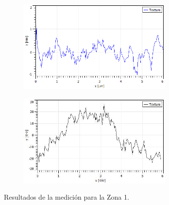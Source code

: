 \begin{figure}[H]
    \begin{subfigure}[b]{0.45\textwidth}
        \includegraphics[width = 0.85\textwidth]{figures/chap4/cdte-ag/afm-nsom-results/10um/CdTe_Ag_10um_profile.jpg}
    \end{subfigure}\hfill
    \begin{subfigure}[b]{0.45\textwidth}
        \includegraphics[width = 0.85\textwidth]{figures/chap4/cdte-ag/afm-nsom-results/10um/CdTe_Ag_10um_profile_nsom.jpg}
    \end{subfigure}
\caption{Resultados de la medición para la Zona 1.}
\label{fig:afm-nsom-results-10um}
\end{figure}

